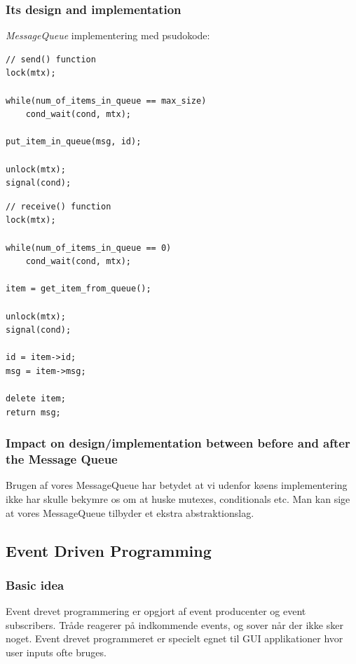 \subsubsection{Its design and implementation}
\textit{MessageQueue} implementering med psudokode:

\begin{lstlisting}[otherkeywords={unlock, lock, signal, cond_wait}]
// send() function
lock(mtx);

while(num_of_items_in_queue == max_size)
	cond_wait(cond, mtx);

put_item_in_queue(msg, id);

unlock(mtx);
signal(cond);
\end{lstlisting}

\begin{lstlisting}
// receive() function
lock(mtx);

while(num_of_items_in_queue == 0)
	cond_wait(cond, mtx);

item = get_item_from_queue();

unlock(mtx);
signal(cond);

id = item->id;
msg = item->msg;

delete item;
return msg;
\end{lstlisting}

\subsubsection{Impact on design/implementation between before and after the Message Queue}

Brugen af vores MessageQueue har betydet at vi udenfor køens implementering ikke har skulle bekymre os om at huske mutexes, conditionals etc. Man kan sige at vores MessageQueue tilbyder et ekstra abstraktionslag.

\subsection{Event Driven Programming}

\subsubsection{Basic idea}
Event drevet programmering er opgjort af event producenter og event subscribers.
Tråde reagerer på indkommende events, og sover når der ikke sker noget.
Event drevet programmeret er specielt egnet til GUI applikationer hvor user inputs ofte bruges. \\

